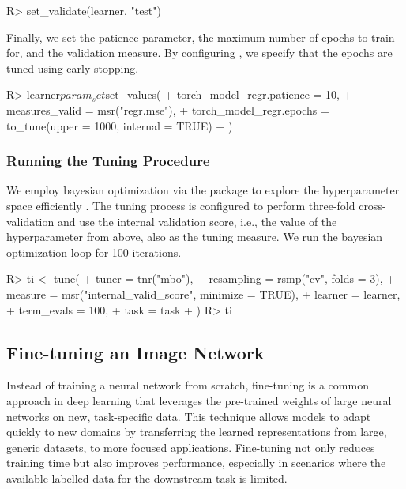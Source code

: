 \documentclass[article]{jss}
\theoremstyle{definition}
\begin{document}
\begin{CodeInput}
R> set_validate(learner, "test")
\end{CodeInput}

Finally, we set the patience parameter, the maximum number of epochs to train for, and the validation measure.
By configuring , we specify that the epochs are tuned using early stopping.

\begin{CodeInput}
R> learner$param_set$set_values(
+    torch_model_regr.patience = 10,
+    measures_valid = msr("regr.mse"),
+    torch_model_regr.epochs = to_tune(upper = 1000, internal = TRUE)
+  )
\end{CodeInput}

\subsubsection{Running the Tuning Procedure}

We employ bayesian optimization via the  package to explore the hyperparameter space efficiently \citep{ref-mlr3mbo}.
The tuning process is configured to perform three-fold cross-validation and use the internal validation score, i.e., the value of the  hyperparameter from above, also as the tuning measure.
We run the bayesian optimization loop for 100 iterations.

\begin{CodeInput}
R> ti <- tune(
+    tuner = tnr("mbo"),
+    resampling = rsmp("cv", folds = 3),
+    measure = msr("internal_valid_score", minimize = TRUE),
+    learner = learner,
+    term_evals = 100,
+    task = task
+  )
R> ti
\end{CodeInput}
\begin{CodeOutput}
\end{CodeOutput}

\subsection{Fine-tuning an Image Network}\label{sec:finetuning}

Instead of training a neural network from scratch, fine-tuning is a common approach in deep learning that leverages the pre-trained weights of large neural networks on new, task-specific data.
This technique allows models to adapt quickly to new domains by transferring the learned representations from large, generic datasets, to more focused applications.
Fine-tuning not only reduces training time but also improves performance, especially in scenarios where the available labelled data for the downstream task is limited.
\end{document}
